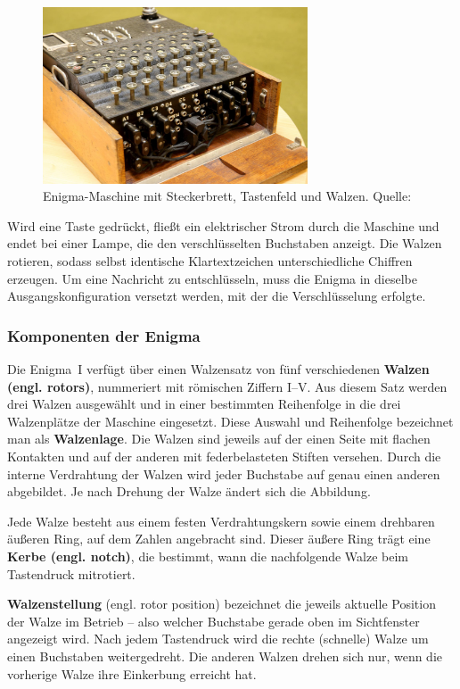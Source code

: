 \documentclass[12pt, ngerman, a4paper, numbers=noenddot]{article}
\begin{document}
\begin{figure}[H]
	\centering
	\includegraphics[width=0.7\textwidth]{bilder/enigma_stecker.jpg}
	\caption{Enigma-Maschine mit Steckerbrett, Tastenfeld und Walzen. Quelle: \cite{welt:enigma}}
	\label{fig:enigma_overview}
\end{figure}

Wird eine Taste gedrückt, fließt ein elektrischer Strom durch die Maschine und endet bei einer Lampe, die den verschlüsselten Buchstaben anzeigt. Die Walzen rotieren, sodass selbst identische Klartextzeichen unterschiedliche Chiffren erzeugen. Um eine Nachricht zu entschlüsseln, muss die Enigma in dieselbe Ausgangskonfiguration versetzt werden, mit der die Verschlüsselung erfolgte.



\subsubsection{Komponenten der Enigma} 
Die Enigma~I verfügt über einen Walzensatz von fünf verschiedenen \textbf{Walzen (engl. rotors)}, nummeriert mit römischen Ziffern I–V. Aus diesem Satz werden drei Walzen ausgewählt und in einer bestimmten Reihenfolge in die drei Walzenplätze der Maschine eingesetzt. Diese Auswahl und Reihenfolge bezeichnet man als \textbf{Walzenlage}. Die Walzen sind jeweils auf der einen Seite mit flachen Kontakten und auf der anderen mit federbelasteten Stiften versehen. Durch die interne Verdrahtung der Walzen wird jeder Buchstabe auf genau einen anderen abgebildet. Je nach Drehung der Walze ändert sich die Abbildung.

Jede Walze besteht aus einem festen Verdrahtungskern sowie einem drehbaren äußeren Ring, auf dem Zahlen angebracht sind. Dieser äußere Ring trägt eine \textbf{Kerbe (engl. notch)}, die bestimmt, wann die nachfolgende Walze beim Tastendruck mitrotiert.

\textbf{Walzenstellung} (engl. rotor position) bezeichnet die jeweils aktuelle Position der Walze im Betrieb – also welcher Buchstabe gerade oben im Sichtfenster angezeigt wird. Nach jedem Tastendruck wird die rechte (schnelle) Walze um einen Buchstaben weitergedreht. Die anderen Walzen drehen sich nur, wenn die vorherige Walze ihre Einkerbung erreicht hat.  
\end{document}
